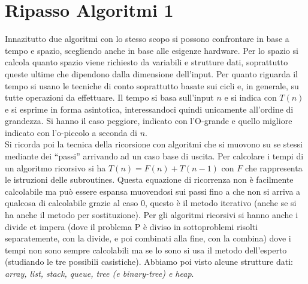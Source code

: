 \documentclass[a4paper,12pt, oneside]{book}
\begin{document}
\section{Ripasso Algoritmi 1}
Innazitutto due algoritmi con lo stesso scopo si possono confrontare
in base a tempo e spazio, scegliendo anche in base alle esigenze
hardware. Per lo spazio si calcola quanto spazio viene richiesto da
variabili e strutture dati, soprattutto queste ultime che dipendono
dalla dimensione dell'input. Per quanto riguarda il tempo si usano le
tecniche di conto soprattutto basate sui cicli e, in generale, su
tutte operazioni da effettuare. Il tempo si basa sull'input $n$ e si
indica con $T(n)$ e si esprime in forma asintotica, interessandoci
quindi unicamente all'ordine di grandezza. Si hanno il caso peggiore,
indicato con l'O-grande e quello migliore indicato con l'o-piccolo
a seconda di $n$.\\
Si ricorda poi la tecnica della ricorsione con algoritmi che si
muovono su se stessi mediante dei ``passi'' arrivando ad un caso base
di uscita. Per calcolare i tempi di un algoritmo ricorsivo si ha
$T(n)=F(n)+T(n-1)$ con $F$ che rappresenta le istruzioni delle
subroutines. Questa equazione di ricorrenza non è facilmente
calcolabile ma può essere espansa muovendosi sui passi fino a che non
si arriva a qualcosa di calcolabile grazie al caso 0, questo è il
metodo iterativo (anche se si ha anche il metodo per
sostituzione). Per gli algoritmi ricorsivi si hanno anche i divide et
impera (dove il problema P è diviso in sottoproblemi risolti
separatemente, con la divide, e poi combinati alla fine, con la
combina) dove i tempi non sono sempre calcolabili ma se lo sono
si usa il metodo dell'esperto (studiando le tre possibili casistiche).
Abbiamo poi visto alcune strutture dati: \textit{array, list, stack, queue,
  tree (e binary-tree) e heap}. 
\end{document}
